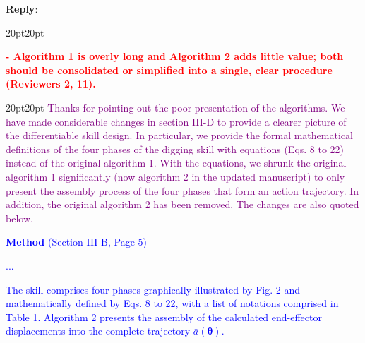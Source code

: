 \documentclass[11pt]{article}
\newcounter{reviewer}
\newcounter{point}[reviewer]
\newenvironment{reply}
   {\medskip \noindent \begin{sf}\textbf{Reply}: \  }
   {\medskip \end{sf}}
\newcommand{\rv}[1]{\textcolor{red}{#1}}
\newcommand{\rp}[1]{\textcolor{purple}{#1}}
\newcommand{\xt}[1]{\textcolor{blue}{#1}}
\begin{document}
\begin{reply}
\begin{adjustwidth}{20pt}{20pt}
\end{adjustwidth}

\vspace{0.3cm}\noindent\rv{\textbf{- Algorithm 1 is overly long and Algorithm 2 adds little value; both should be consolidated or simplified into a single, clear procedure (Reviewers 2, 11).}}
\begin{adjustwidth}{20pt}{20pt}
\rp{Thanks for pointing out the poor presentation of the algorithms. We have made considerable changes in section III-D to provide a clearer picture of the differentiable skill design. In particular, we provide the formal mathematical definitions of the four phases of the digging skill with equations (Eqs. 8 to 22) instead of the original algorithm 1. With the equations, we shrunk the original algorithm 1 significantly (now algorithm 2 in the updated manuscript) to only present the assembly process of the four phases that form an action trajectory. In addition, the original algorithm 2 has been removed. The changes are also quoted below.}

\vspace{0.3cm}\noindent\xt{\textbf{Method} (Section III-B, Page 5)}

\xt{...}

\xt{The skill comprises four phases graphically illustrated by Fig. 2 and mathematically defined by Eqs. 8 to 22, with a list of notations comprised in Table 1. Algorithm 2 presents the assembly of the calculated end-effector displacements into the complete trajectory $\bar{a}(\pmb{\theta})$.}


\end{adjustwidth}
\end{reply}
\end{document}
